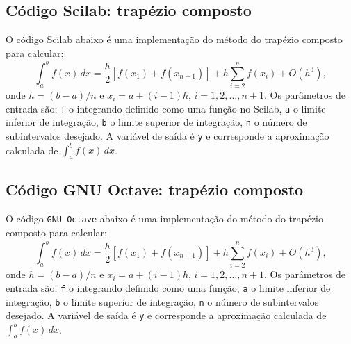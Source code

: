 \ifisscilab
\subsection{Código Scilab: trapézio composto}
O código Scilab abaixo é uma implementação do método do trapézio composto para calcular:
\begin{equation*}
  \int_a^b f(x)\,dx = \frac{h}{2}\left[f(x_1) + f(x_{n+1})\right] + h\sum_{i=2}^n f(x_i) + O(h^3),
\end{equation*}
onde $h = (b-a)/n$ e $x_i = a + (i-1)h$, $i=1,2,\dotsc,n+1$. Os parâmetros de entrada são: \verb+f+ o integrando definido como uma função no Scilab, \verb+a+ o limite inferior de integração, \verb+b+ o limite superior de integração, \verb+n+ o número de subintervalos desejado. A variável de saída é \verb+y+ e corresponde a aproximação calculada de $\int_a^b f(x)\, dx$.


\fi
\ifisoctave
\subsection{Código GNU Octave: trapézio composto}
O código \verb+GNU Octave+ abaixo é uma implementação do método do trapézio composto para calcular:
\begin{equation*}
  \int_a^b f(x)\,dx = \frac{h}{2}\left[f(x_1) + f(x_{n+1})\right] + h\sum_{i=2}^n f(x_i) + O(h^3),
\end{equation*}
onde $h = (b-a)/n$ e $x_i = a + (i-1)h$, $i=1,2,\dotsc,n+1$. Os parâmetros de entrada são: \verb+f+ o integrando definido como uma função, \verb+a+ o limite inferior de integração, \verb+b+ o limite superior de integração, \verb+n+ o número de subintervalos desejado. A variável de saída é \verb+y+ e corresponde a aproximação calculada de $\int_a^b f(x)\, dx$.


\fi

